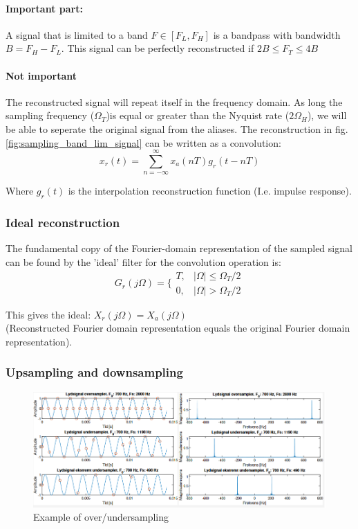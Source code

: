 \documentclass{article}
\begin{document}
\paragraph{Important part:} A signal that is limited to a band $F \in [F_L,F_H]$ is a bandpass with bandwidth $B = F_H - F_L$. This signal can be perfectly reconstructed if $2B \le F_T \le 4B$

\paragraph{Not important}The reconstructed signal will repeat itself in the frequency domain. As long the sampling frequency ($\Omega_T$)is equal or greater than the Nyquist rate ($2\Omega_H$), we will be able to seperate the original signal from the aliases. The reconstruction in fig. \ref{fig:sampling_band_lim_signal} can be written as a convolution:
\begin{equation}
    x_r (t) = \sum_{n=-\infty}^{\infty} x_a (nT) g_r (t - nT) 
\end{equation}

Where $g_r (t)$ is the interpolation reconstruction function (I.e. impulse response). 

\subsubsection{Ideal reconstruction}

The fundamental copy of the Fourier-domain representation of the sampled signal can be found by the 'ideal' filter for the convolution operation is: 
\begin{equation}
    G_r (j\Omega) = \bigg\{ \begin{matrix}
        T, & |\Omega| \leq \Omega_T /2 \\
        0, & |\Omega| > \Omega_T / 2
    \end{matrix}
\end{equation}

This gives the ideal: $X_r (j\Omega) = X_a (j\Omega)$ \\ (Reconstructed Fourier domain representation equals the original Fourier domain representation).

\clearpage
\subsubsection{Upsampling and downsampling}
\begin{figure}[h!]
    \centering
    \includegraphics[width=1\textwidth]{figures/Sampling and reconstruction/sampling_examples.png}
    \caption{Example of over/undersampling}
    \label{fig:sampling_example}
\end{figure}
\end{document}
